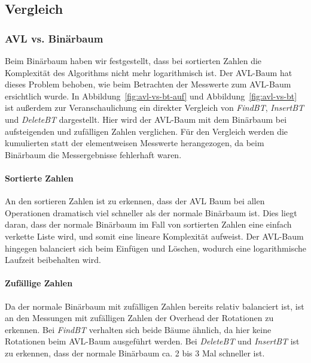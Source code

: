 
\subsection{Vergleich}\label{subsec:vergleich}

\subsubsection{AVL vs. Binärbaum}
Beim Binärbaum haben wir festgestellt, dass bei sortierten Zahlen die Komplexität des
Algorithms nicht mehr logarithmisch ist.
Der AVL-Baum hat dieses Problem behoben, wie beim Betrachten der Messwerte zum AVL-Baum
ersichtlich wurde.
In Abbildung~\ref{fig:avl-vs-bt-auf} und Abbildung~\ref{fig:avl-vs-bt} ist außerdem zur
Veranschaulichung ein direkter Vergleich von \textit{FindBT}, \textit{InsertBT} und \textit{DeleteBT}
dargestellt.
Hier wird der AVL-Baum mit dem Binärbaum bei aufsteigenden und zufälligen Zahlen verglichen.
Für den Vergleich werden die kumulierten statt der elementweisen Messwerte herangezogen, da beim
Binärbaum die Messergebnisse fehlerhaft waren.

\paragraph{Sortierte Zahlen}
An den sortieren Zahlen ist zu erkennen, dass der AVL Baum bei allen Operationen dramatisch viel
schneller als der normale Binärbaum ist.
Dies liegt daran, dass der normale Binärbaum im Fall von sortierten Zahlen eine einfach verkette
Liste wird, und somit eine lineare Komplexität aufweist.
Der AVL-Baum hingegen balanciert sich beim Einfügen und Löschen, wodurch eine logarithmische
Laufzeit beibehalten wird.

\paragraph{Zufällige Zahlen}
Da der normale Binärbaum mit zufälligen Zahlen bereits relativ balanciert ist,
ist an den Messungen mit zufälligen Zahlen der Overhead der Rotationen zu erkennen.
Bei \textit{FindBT} verhalten sich beide Bäume ähnlich, da hier keine Rotationen beim AVL-Baum
ausgeführt werden.
Bei \textit{DeleteBT} und \textit{InsertBT} ist zu erkennen, dass der normale Binärbaum ca. 2 bis
3 Mal schneller ist.



